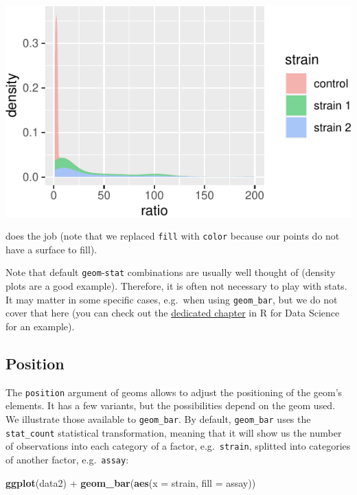 \documentclass[]{book}
\newenvironment{Shaded}{}{}
\newcommand{\DataTypeTok}[1]{\textcolor[rgb]{0.56,0.13,0.00}{#1}}
\newcommand{\KeywordTok}[1]{\textcolor[rgb]{0.00,0.44,0.13}{\textbf{#1}}}
\newcommand{\NormalTok}[1]{#1}
\newcommand{\OperatorTok}[1]{\textcolor[rgb]{0.40,0.40,0.40}{#1}}
\newcommand{\StringTok}[1]{\textcolor[rgb]{0.25,0.44,0.63}{#1}}
\begin{document}
\begin{center}\includegraphics[width=\textwidth]{TRES-Tidy-Tutorial_files/figure-latex/unnamed-chunk-114-1} \end{center}

does the job (note that we replaced \texttt{fill} with \texttt{color} because our points do not have a surface to fill).

Note that default \texttt{geom}-\texttt{stat} combinations are usually well thought of (density plots are a good example). Therefore, it is often not necessary to play with stats. It may matter in some specific cases, e.g.~when using \texttt{geom\_bar}, but we do not cover that here (you can check out the \href{https://r4ds.had.co.nz/data-visualisation.html\#statistical-transformations}{dedicated chapter} in R for Data Science for an example).

\hypertarget{position}{%
\subsection{Position}\label{position}}

The \texttt{position} argument of geoms allows to adjust the positioning of the geom's elements. It has a few variants, but the possibilities depend on the geom used. We illustrate those available to \texttt{geom\_bar}. By default, \texttt{geom\_bar} uses the \texttt{stat\_count} statistical transformation, meaning that it will show us the number of observations into each category of a factor, e.g.~\texttt{strain}, splitted into categories of another factor, e.g.~\texttt{assay}:

\begin{Shaded}
\begin{Highlighting}[]
\KeywordTok{ggplot}\NormalTok{(data2) }\OperatorTok{+}
\StringTok{  }\KeywordTok{geom_bar}\NormalTok{(}\KeywordTok{aes}\NormalTok{(}\DataTypeTok{x =}\NormalTok{ strain, }\DataTypeTok{fill =}\NormalTok{ assay))}
\end{Highlighting}
\end{Shaded}
\end{document}
